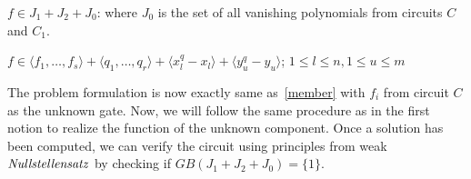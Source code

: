 $f \in J_1 + J_2 + J_0$: where $J_0$ is the set of all vanishing polynomials from circuits $C$ and $C_1$.

{\small $f \in \langle f_1,\dots,f_s\rangle + \langle q_1,\dots,q_r\rangle + \langle x_l^q-x_l\rangle + \langle y_u^q-y_u\rangle$; $1\le l \le n,1\le u \le m$}

The problem formulation is now exactly same as~\eqref{member} with $f_i$ from circuit $C$ as the unknown gate. Now, we will follow the same procedure as in the first notion to realize the function of the unknown component. Once a solution has been computed, we can verify the circuit using principles from weak $\it{Nullstellensatz}$ by checking if $GB(J_1+J_2+J_0)=\{1\}$.







